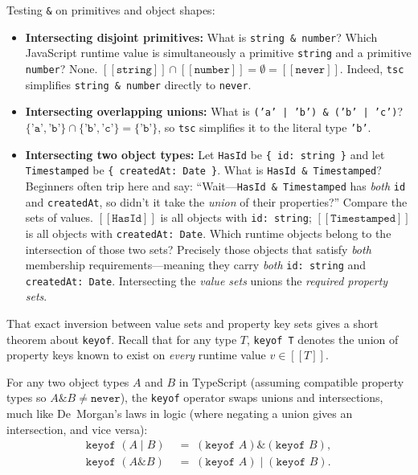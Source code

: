 Testing \texttt{\&} on primitives and object shapes:
\begin{itemize}
  \item \textbf{Intersecting disjoint primitives:} What is \texttt{string \& number}? Which JavaScript runtime value is simultaneously a primitive \texttt{string} and a primitive \texttt{number}? None. $[\![ \texttt{string} ]\!] \cap [\![ \texttt{number} ]\!] = \emptyset = [\![ \texttt{never} ]\!]$. Indeed, \texttt{tsc} simplifies \texttt{string \& number} directly to \texttt{never}.
  \item \textbf{Intersecting overlapping unions:} What is \texttt{('a' | 'b') \& ('b' | 'c')}? $\{ \texttt{'a'}, \texttt{'b'} \} \cap \{ \texttt{'b'}, \texttt{'c'} \} = \{ \texttt{'b'} \}$, so \texttt{tsc} simplifies it to the literal type \texttt{'b'}.
  \item \textbf{Intersecting two object types:} Let \texttt{HasId} be \texttt{\{ id: string \}} and let \texttt{Timestamped} be \texttt{\{ createdAt: Date \}}. What is \texttt{HasId \& Timestamped}? Beginners often trip here and say: ``Wait---\texttt{HasId \& Timestamped} has \emph{both} \texttt{id} and \texttt{createdAt}, so didn't it take the \emph{union} of their properties?'' Compare the sets of values. $[\![ \texttt{HasId} ]\!]$ is all objects with \texttt{id: string}; $[\![ \texttt{Timestamped} ]\!]$ is all objects with \texttt{createdAt: Date}. Which runtime objects belong to the intersection of those two sets? Precisely those objects that satisfy \emph{both} membership requirements---meaning they carry \emph{both} \texttt{id: string} and \texttt{createdAt: Date}. Intersecting the \emph{value sets} unions the \emph{required property sets}.
\end{itemize}

That exact inversion between value sets and property key sets gives a short theorem about \texttt{keyof}. Recall that for any type $T$, \texttt{keyof T} denotes the union of property keys known to exist on \emph{every} runtime value $v \in [\![ T ]\!]$.

\begin{theorem}
\label{ch09:thm-keyof-duality}
For any two object types $A$ and $B$ in TypeScript (assuming compatible property types so $A \mathbin{\&} B \neq \texttt{never}$), the \texttt{keyof} operator swaps unions and intersections, much like De~Morgan's laws in logic (where negating a union gives an intersection, and vice versa):
\begin{align}
  \texttt{keyof }(A \mid B) &\;=\; (\texttt{keyof } A) \mathbin{\&} (\texttt{keyof } B), \label{eq:ch09-keyof-union}\\
  \texttt{keyof }(A \mathbin{\&} B) &\;=\; (\texttt{keyof } A) \mid (\texttt{keyof } B). \label{eq:ch09-keyof-inter}
\end{align}
\end{theorem}

